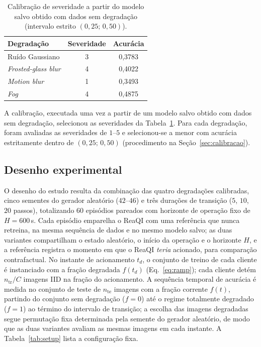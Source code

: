 \documentclass[conference]{IEEEtran}
\begin{document}
\begin{table}[!t]
\centering
\caption{Calibração de severidade a partir do modelo salvo obtido com dados sem degradação (intervalo estrito $(0{,}25;\,0{,}50)$).}
\label{tab:calibration}
\begin{tabular}{lcc}
\toprule
Degradação & Severidade & Acurácia\\
\midrule
Ruído Gaussiano & 3 & 0,3783\\
\textit{Frosted-glass blur} & 4 & 0,4022\\
\textit{Motion blur} & 1 & 0,3493\\
\textit{Fog} & 4 & 0,4875\\
\bottomrule
\end{tabular}
\end{table}
A calibração, executada uma vez a partir de um modelo salvo obtido com dados sem degradação, selecionou as severidades da Tabela~\ref{tab:calibration}. Para cada degradação, foram avaliadas as severidades de $1$--$5$ e selecionou-se a menor com acurácia estritamente dentro de $(0{,}25;\,0{,}50)$ (procedimento na Seção~\ref{sec:calibracao}).

\subsection{Desenho experimental}
O desenho do estudo resulta da combinação das quatro degradações calibradas, cinco sementes do gerador aleatório ($42$--$46$) e três durações de transição ($5$, $10$, $20$ passos), totalizando 60 episódios pareados com horizonte de operação fixo de $H=600$\,s. Cada episódio emparelha o ReaQI com uma referência que nunca retreina, na mesma sequência de dados e no mesmo modelo salvo; as duas variantes compartilham o estado aleatório, o início da operação e o horizonte $H$, e a referência registra o momento em que o ReaQI \emph{teria} acionado, para comparação contrafactual. No instante de acionamento $t_d$, o conjunto de treino de cada cliente é instanciado com a fração degradada $f(t_d)$ (Eq.~\eqref{eq:ramp}); cada cliente detém $n_{\mathrm{tr}}/C$ imagens IID na fração do acionamento. A sequência temporal de acurácia é medida no conjunto de teste de $n_{\mathrm{te}}$ imagens com a fração corrente $f(t)$, partindo do conjunto sem degradação ($f=0$) até o regime totalmente degradado ($f=1$) ao término do intervalo de transição; a escolha das imagens degradadas segue permutação fixa determinada pela semente do gerador aleatório, de modo que as duas variantes avaliam as mesmas imagens em cada instante. A Tabela~\ref{tab:setup} lista a configuração fixa.
\end{document}
